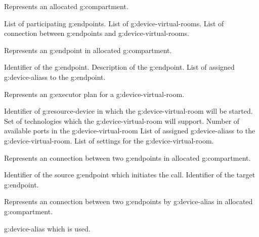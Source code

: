 \begin{Api}
Represents an allocated \gls{g:compartment}.
\begin{ApiClassAttributes}
 List of participating \glspl{g:endpoint}.
 List of \glspl{g:device-virtual-room}.
 List of connection between \glspl{g:endpoint} and \glspl{g:device-virtual-room}.
\end{ApiClassAttributes}

Represents an \gls{g:endpoint} in allocated \gls{g:compartment}.
\begin{ApiClassAttributes}
 Identifier of the \gls{g:endpoint}.
 Description of the \gls{g:endpoint}.
 List of assigned \glspl{g:device-alias} to the \gls{g:endpoint}.
\end{ApiClassAttributes}

Represents an \gls{g:executor} plan for a \gls{g:device-virtual-room}.
\begin{ApiClassAttributes}
 Identifier of \gls{g:resource-device} in which the \gls{g:device-virtual-room} will be started.
 Set of technologies which the \gls{g:device-virtual-room} will support.
 Number of available ports in the \gls{g:device-virtual-room}
 List of assigned \glspl{g:device-alias} to the \gls{g:device-virtual-room}.
 List of settings for the \gls{g:device-virtual-room}.
\end{ApiClassAttributes}

Represents an connection between two \glspl{g:endpoint} in allocated \gls{g:compartment}.
\begin{ApiClassAttributes}
 Identifier of the source \gls{g:endpoint} which initiates the call.
 Identifier of the target \gls{g:endpoint}.
\end{ApiClassAttributes}

Represents an connection between two \glspl{g:endpoint} by \gls{g:device-alias} in allocated \gls{g:compartment}.
\begin{ApiClassAttributes}
 \Gls{g:device-alias} which is used.
\end{ApiClassAttributes}


\end{Api}
